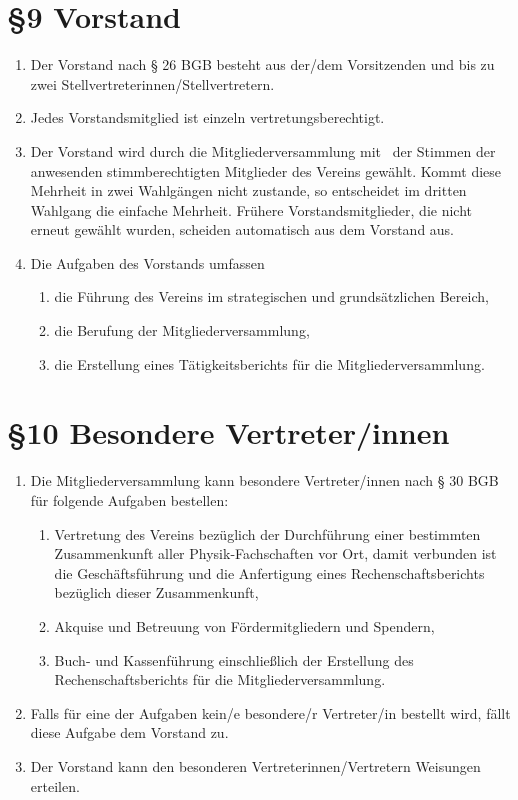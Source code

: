 \documentclass[ngerman]{article}
\begin{document}
\section*{§9 Vorstand}
\begin{enumerate}
 \item Der Vorstand nach § 26 BGB besteht aus der/dem Vorsitzenden und bis zu zwei Stellvertreterinnen/Stellvertretern.
 \item Jedes Vorstandsmitglied ist einzeln vertretungsberechtigt.
 \item Der Vorstand wird durch die Mitgliederversammlung mit \ der Stimmen der anwesenden stimmberechtigten Mitglieder des Vereins gewählt.
       Kommt diese Mehrheit in zwei Wahlgängen nicht zustande, so entscheidet im dritten Wahlgang die einfache Mehrheit.
       Frühere Vorstandsmitglieder, die nicht erneut gewählt wurden, scheiden automatisch aus dem Vorstand aus.
 \item Die Aufgaben des Vorstands umfassen
  \begin{enumerate}
   \item die Führung des Vereins im strategischen und grundsätzlichen Bereich,
   \item die Berufung der Mitgliederversammlung,
   \item die Erstellung eines Tätigkeitsberichts für die Mitgliederversammlung.
  \end{enumerate}
\end{enumerate}


\section*{§10 Besondere Vertreter/innen}
\begin{enumerate}
 \item Die Mitgliederversammlung kann besondere Vertreter/innen nach § 30 BGB für folgende Aufgaben bestellen:
 \begin{enumerate}
  \item Vertretung des Vereins bezüglich der Durchführung einer bestimmten Zusammenkunft aller Physik-Fachschaften vor Ort,
        damit verbunden ist die Geschäftsführung und die Anfertigung eines Rechenschaftsberichts bezüglich dieser Zusammenkunft,
  \item Akquise und Betreuung von Fördermitgliedern und Spendern,
  \item Buch- und Kassenführung einschließlich der Erstellung des Rechenschaftsberichts für die Mitgliederversammlung.
 \end{enumerate}
 \item Falls für eine der Aufgaben kein/e besondere/r Vertreter/in bestellt wird, fällt diese Aufgabe dem Vorstand zu.
 \item Der Vorstand kann den besonderen Vertreterinnen/Vertretern Weisungen erteilen.
\end{enumerate}
\end{document}
